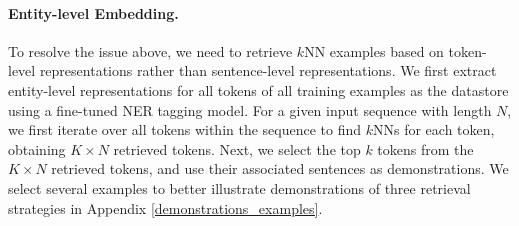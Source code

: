 \documentclass[11pt]{article}
\begin{document}
\paragraph{Entity-level Embedding.}
\label{entity_level_embedding}
To resolve the issue above, we need to retrieve $k$NN examples based on token-level representations rather than 
sentence-level representations. 
We first extract entity-level representations
for all tokens of all training examples as the datastore 
 using a fine-tuned NER tagging model. 
 For a given input sequence with length $N$, we first iterate over all tokens within the sequence to find $k$NNs for each token, obtaining $K\times N$ retrieved tokens. 
 Next, we select the top $k$ tokens from the 
$K\times N$ retrieved tokens, and use their associated sentences as demonstrations. 
We select several examples to better illustrate demonstrations of three retrieval strategies in Appendix \ref{demonstrations_examples}.
 





\end{document}
